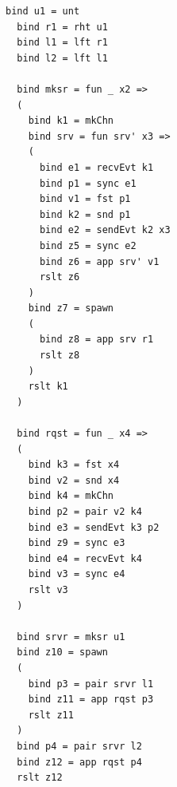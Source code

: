 \documentclass[letterpaper, 11pt]{extarticle}
\begin{document}
\begin{lstlisting}[language=normal_lang, mathescape]
  bind u1 = unt
  bind r1 = rht u1
  bind l1 = lft r1
  bind l2 = lft l1

  bind mksr = fun _ x2 => 
  (
    bind k1 = mkChn
    bind srv = fun srv' x3 =>
    (
      bind e1 = recvEvt k1
      bind p1 = sync e1
      bind v1 = fst p1
      bind k2 = snd p1 
      bind e2 = sendEvt k2 x3
      bind z5 = sync e2
      bind z6 = app srv' v1
      rslt z6 
    )
    bind z7 = spawn
    (
      bind z8 = app srv r1
      rslt z8 
    )
    rslt k1
  )

  bind rqst = fun _ x4 =>
  (
    bind k3 = fst x4
    bind v2 = snd x4
    bind k4 = mkChn
    bind p2 = pair v2 k4
    bind e3 = sendEvt k3 p2
    bind z9 = sync e3
    bind e4 = recvEvt k4
    bind v3 = sync e4
    rslt v3
  )

  bind srvr = mksr u1
  bind z10 = spawn
  ( 
    bind p3 = pair srvr l1
    bind z11 = app rqst p3
    rslt z11
  )
  bind p4 = pair srvr l2
  bind z12 = app rqst p4
  rslt z12
\end{lstlisting}
\end{document}
